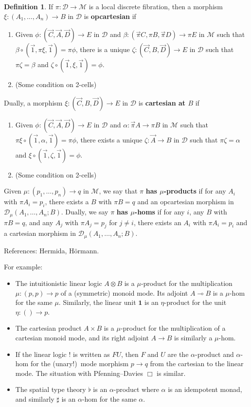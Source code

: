 \documentclass{amsart}
\theoremstyle{definition}
\newtheorem{defn}[thm]{Definition}
\def\M{\mathcal{M}}
\def\D{\mathcal{D}}
\begin{document}
\begin{defn}
  If $\pi:\D\to\M$ is a local discrete fibration, then a morphism $\xi:(A_1,\dots,A_n)\to B$ in $\D$ is \textbf{opcartesian} if
  \begin{enumerate}
  \item Given $\phi:(\vec C,\vec A,\vec D)\to E$ in $\D$ and $\beta : (\vec \pi C,\pi B, \vec\pi D)\to \pi E$ in $\M$ such that $\beta \circ (\vec 1,\pi \xi,\vec 1) = \pi\phi$, there is a unique $\zeta:(\vec C, B,\vec D) \to E$ in $\D$ such that $\pi\zeta = \beta$ and $\zeta\circ(\vec 1,\xi,\vec 1) = \phi$.
  \item (Some condition on 2-cells)
  \end{enumerate}
  Dually, a morphism $\xi:(\vec C,B,\vec D)\to E$ in $\D$ is \textbf{cartesian at $B$} if
  \begin{enumerate}
  \item Given $\phi:(\vec C,\vec A,\vec D)\to E$ in $\D$ and $\alpha : \vec \pi A\to \pi B$ in $\M$ such that $\pi \xi \circ (\vec 1,\alpha,\vec 1) = \pi \phi$, there exists a unique $\zeta:\vec A \to B$ in $\D$ such that $\pi \zeta = \alpha$ and $\xi\circ (\vec 1,\zeta,\vec 1) = \phi$.
  \item (Some condition on 2-cells)
  \end{enumerate}
  Given $\mu:(p_1,\dots,p_n) \to q$ in $\M$, we say that $\pi$ \textbf{has $\mu$-products} if for any $A_i$ with $\pi A_i = p_i$, there exists a $B$ with $\pi B = q$ and an opcartesian morphism in $\D_\mu(A_1,\dots,A_n;B)$.
  Dually, we say $\pi$ \textbf{has $\mu$-homs} if for any $i$, any $B$ with $\pi B = q$, and any $A_j$ with $\pi A_j = p_j$ for $j\neq i$, there exists an $A_i$ with $\pi A_i = p_i$ and a cartesian morphism in $\D_\mu(A_1,\dots,A_n;B)$.
\end{defn}

References: Hermida, H\"{o}rmann.

For example:
\begin{itemize}
\item The intuitionistic linear logic $A \otimes B$ is a $\mu$-product for the multiplication $\mu:(p,p)\to p$ of a (symmetric) monoid mode.
  Its adjoint $A\multimap B$ is a $\mu$-hom for the same $\mu$.
  Similarly, the linear unit $\mathbf{1}$ is an $\eta$-product for the unit $\eta :()\to p$.
\item The cartesian product $A\times B$ is a $\mu$-product for the multiplication of a cartesian monoid mode, and its right adjoint $A\to B$ is similarly a $\mu$-hom.
\item If the linear logic $!$ is written as $F U$, then $F$ and $U$ are the $\alpha$-product and $\alpha$-hom for the (unary!)\ mode morphism $p\to q$ from the cartesian to the linear mode.
  The situation with Pfenning--Davies $\Box$ is similar.
\item The spatial type theory $\flat$ is an $\alpha$-product where $\alpha$ is an idempotent monad, and similarly $\sharp$ is an $\alpha$-hom for the same $\alpha$.
\end{itemize}
\end{document}
